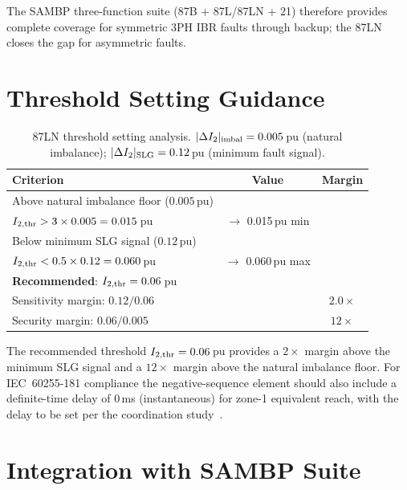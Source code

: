 \documentclass[11pt, a4paper]{article}
\begin{document}
The SAMBP three-function suite (87B + 87L/87LN + 21) therefore provides
complete coverage for symmetric 3PH IBR faults through backup; the
87LN closes the gap for asymmetric faults.


\section{Threshold Setting Guidance}
\label{sec:threshold}

\begin{table}[h]
  \centering
  \caption{87LN threshold setting analysis.
           $|\Delta I_2|_{\rm imbal}=0.005$\,pu (natural imbalance);
           $|\Delta I_2|_{\rm SLG}=0.12$\,pu (minimum fault signal).}
  \label{tab:threshold}
  \begin{tabular}{lcc}
    \toprule
    Criterion & Value & Margin \\
    \midrule
    Above natural imbalance floor ($0.005$\,pu) & & \\
    \quad $I_{2,\rm thr} > 3 \times 0.005 = 0.015$\,pu & $\to$ 0.015\,pu min & \\
    Below minimum SLG signal ($0.12$\,pu) & & \\
    \quad $I_{2,\rm thr} < 0.5 \times 0.12 = 0.060$\,pu & $\to$ 0.060\,pu max & \\
    \midrule
    \textbf{Recommended}: $I_{2,\rm thr} = 0.06$\,pu & & \\
    \quad Sensitivity margin: $0.12 / 0.06$ & & $2.0\times$ \\
    \quad Security margin: $0.06 / 0.005$ & & $12\times$ \\
    \bottomrule
  \end{tabular}
\end{table}

The recommended threshold $I_{2,\rm thr} = 0.06$\,pu provides a $2\times$
margin above the minimum SLG signal and a $12\times$ margin above the
natural imbalance floor.  For IEC~60255-181 compliance the negative-sequence
element should also include a definite-time delay of 0\,ms (instantaneous)
for zone-1 equivalent reach, with the delay to be set per the
coordination study~\cite{IEC_60255_181,Stevenson1994}.


\section{Integration with SAMBP Suite}
\label{sec:integration}
\end{document}
